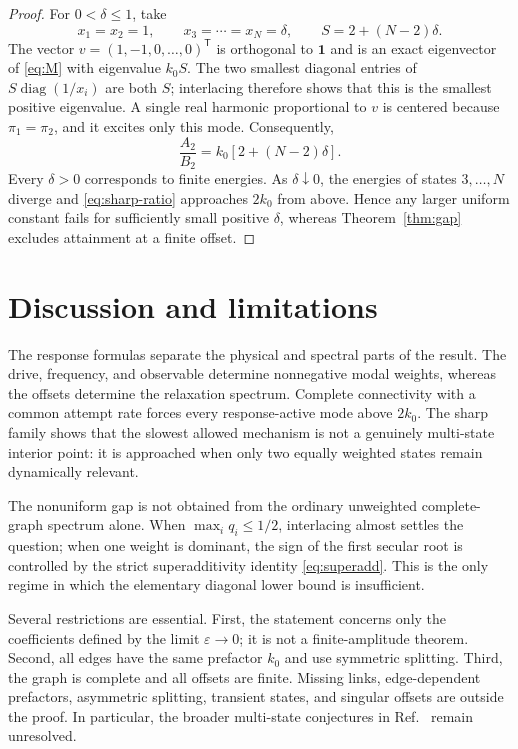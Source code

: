 \documentclass[11pt]{article}
\newcommand{\one}{\bm{1}}
\newcommand{\diag}{\operatorname{diag}}
\begin{document}
\begin{proof}
For $0<\delta\leq1$, take
\begin{equation}
 x_1=x_2=1,\qquad x_3=\cdots=x_N=\delta,
 \qquad S=2+(N-2)\delta.                                    \label{eq:boundary-family}
\end{equation}
The vector $v=(1,-1,0,\ldots,0)^{\mathsf T}$ is orthogonal to $\one$ and is an
exact eigenvector of \eqref{eq:M} with eigenvalue $k_0S$.  The two smallest diagonal
entries of $S\diag(1/x_i)$ are both $S$; interlacing therefore shows that this is the
smallest positive eigenvalue.  A single real harmonic proportional to $v$ is centered
because $\pi_1=\pi_2$, and it excites only this mode.  Consequently,
\begin{equation}
 \frac{A_2}{B_2}=k_0\left[2+(N-2)\delta\right].              \label{eq:sharp-ratio}
\end{equation}
Every $\delta>0$ corresponds to finite energies.  As $\delta\downarrow0$, the
energies of states $3,\ldots,N$ diverge and \eqref{eq:sharp-ratio} approaches
$2k_0$ from above.  Hence any larger uniform constant fails for sufficiently small
positive $\delta$, whereas Theorem~\ref{thm:gap} excludes attainment at a finite offset.
\end{proof}

\section{Discussion and limitations}

The response formulas separate the physical and spectral parts of the result.  The
drive, frequency, and observable determine nonnegative modal weights, whereas the
offsets determine the relaxation spectrum.  Complete connectivity with a common
attempt rate forces every response-active mode above $2k_0$.  The sharp family shows
that the slowest allowed mechanism is not a genuinely multi-state interior point: it
is approached when only two equally weighted states remain dynamically relevant.

The nonuniform gap is not obtained from the ordinary unweighted complete-graph
spectrum alone.  When $\max_i q_i\leq1/2$, interlacing almost settles the question;
when one weight is dominant, the sign of the first secular root is controlled by the
strict superadditivity identity \eqref{eq:superadd}.  This is the only regime in which
the elementary diagonal lower bound is insufficient.

Several restrictions are essential.  First, the statement concerns only the
coefficients defined by the limit $\varepsilon\to0$; it is not a finite-amplitude
theorem.  Second, all edges have the same prefactor $k_0$ and use symmetric splitting.
Third, the graph is complete and all offsets are finite.  Missing links,
edge-dependent prefactors, asymmetric splitting, transient states, and singular
offsets are outside the proof.  In particular, the broader multi-state conjectures in
Ref.~\cite{Deguenther2022} remain unresolved.
\end{document}
